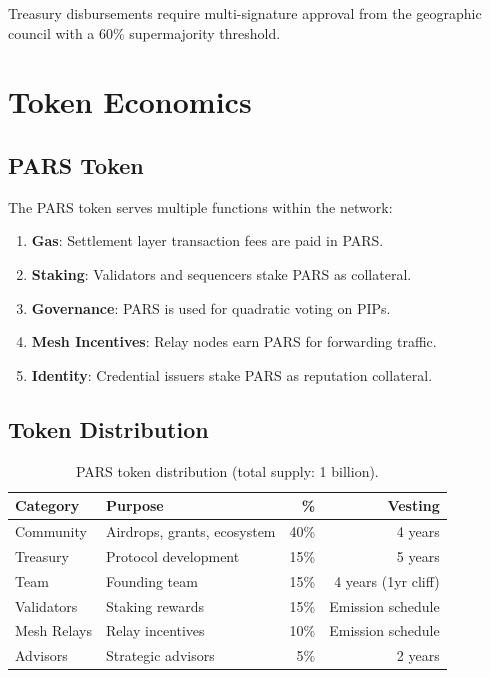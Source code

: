 \documentclass[11pt,a4paper,twocolumn]{article}
\begin{document}
Treasury disbursements require multi-signature approval from the geographic council with a 60\% supermajority threshold.

\section{Token Economics}
\label{sec:tokenomics}

\subsection{PARS Token}

The PARS token serves multiple functions within the network:

\begin{enumerate}[leftmargin=*]
  \item \textbf{Gas}: Settlement layer transaction fees are paid in PARS.
  \item \textbf{Staking}: Validators and sequencers stake PARS as collateral.
  \item \textbf{Governance}: PARS is used for quadratic voting on PIPs.
  \item \textbf{Mesh Incentives}: Relay nodes earn PARS for forwarding traffic.
  \item \textbf{Identity}: Credential issuers stake PARS as reputation collateral.
\end{enumerate}

\subsection{Token Distribution}

\begin{table}[H]
\centering
\caption{PARS token distribution (total supply: 1 billion).}
\label{tab:distribution}
\begin{tabularx}{\columnwidth}{lXrr}
\toprule
\textbf{Category} & \textbf{Purpose} & \textbf{\%} & \textbf{Vesting} \\
\midrule
Community & Airdrops, grants, ecosystem & 40\% & 4 years \\
Treasury & Protocol development & 15\% & 5 years \\
Team & Founding team & 15\% & 4 years (1yr cliff) \\
Validators & Staking rewards & 15\% & Emission schedule \\
Mesh Relays & Relay incentives & 10\% & Emission schedule \\
Advisors & Strategic advisors & 5\% & 2 years \\
\bottomrule
\end{tabularx}
\end{table}
\end{document}
